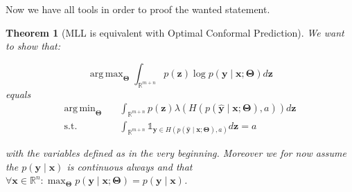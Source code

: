 \documentclass{article}
\DeclareMathOperator*{\argmin}{arg\,min}
\DeclareMathOperator*{\argmax}{arg\,max}
\newtheorem{theorem}{Theorem}[section]
\theoremstyle{definition}
\begin{document}
Now we have all tools in order to proof the wanted statement.

\begin{theorem}[MLL is equivalent with Optimal Conformal Prediction]
We want to show that:

$$\argmax_{\mathbf{\Theta}}  \int_{\mathbb{R}^{m + n}} p(\mathbf{z}) \log p(\mathbf{y} \mid \mathbf{x}; \mathbf{\Theta}) d \mathbf{z}$$
equals
\begin{align}
\argmin_{\mathbf{\Theta}} \quad & \int_{\mathbb{R}^{m + n}} p(\mathbf{z}) \lambda(H(p(\mathbf{\hat{y}} \mid \mathbf{x}; \mathbf{\Theta}), a)) d\mathbf{z} \\
\text{s.t.} \quad & \int_{\mathbb{R}^{m + n}} \mathds{1}_{\mathbf{y} \in H(p(\mathbf{\hat{y}} \mid \mathbf{x}; \mathbf{\Theta}), a)} d\mathbf{z} = a
\end{align}

with the variables defined as in the very beginning. Moreover we for now assume the $p(\mathbf{y}\mid \mathbf{x})$ is continuous always and that $\forall \mathbf{x}\in \mathbb{R}^n: \max_{\mathbf{\Theta}} p(\mathbf{y} \mid \mathbf{x}; \mathbf{\Theta}) = p(\mathbf{y} \mid \mathbf{x})$.

\end{theorem}
\end{document}
